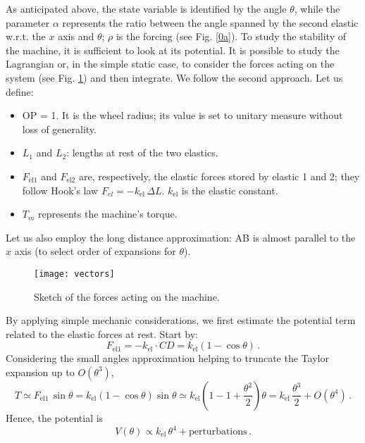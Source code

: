 As anticipated above, the state variable is identified by the angle $\theta$, while the parameter $\alpha$ represents the ratio between the angle spanned by the second elastic w.r.t. the $x$ axis and $\theta$; $\rho$ is the forcing (see Fig. \ref{0a}). To study the stability of the machine, it is sufficient to look at its potential. It is possible to study the Lagrangian \citep{nagy2013zeeman} or, in the simple static case, to consider the forces acting on the system (see Fig. \ref{vector}) and then integrate. We follow the second approach. Let us define:
\begin{itemize}
	\item OP = 1. It is the wheel radius; its value is set to unitary measure without loss of generality.
	\item $L_1$ and $L_2$: lengths at rest of the two elastics.
	\item  $F_{\text{el1}}$ and $F_{\text{el2}}$ are, respectively, the elastic forces stored by elastic 1 and 2; they follow Hook's law $F_{el} = -k_{\text{el}} \, \Delta L$. $k_{\text{el}}$ is the elastic constant.
	\item $T_m$ represents the machine's torque.
\end{itemize}
Let us also employ the long distance approximation: AB is almost parallel to the $x$ axis (to select order of expansions for $\theta$).

\begin{figure}[h!]
	\centering
	\texttt{[image: vectors]}
	\caption{\small Sketch of the forces acting on the machine.}
	\label{vector}
\end{figure}

By applying simple mechanic considerations, we first estimate the potential term related to the elastic forces at rest. Start by:
\begin{equation*}
	F_{\text{el1}} = -k_{\text{el}}  \cdot CD = k_{\text{el}} (1-\cos\theta) \, .
\end{equation*}
Considering the small angles approximation helping to truncate the Taylor expansion up to $O(\theta^3)$,
\begin{equation*}
	T \simeq F_{\text{el1}} \, \sin\theta = k_{\text{el}} (1-\cos\theta)\sin\theta \simeq k_{\text{el}} \left(1-1+\frac{\theta^2}{2} \right)\theta = k_{\text{el}} \, \frac{\theta^3}{2} + O(\theta^4) \, .
\end{equation*}
Hence, the potential is 
\begin{equation*}
	V(\theta) \propto k_{\text{el}} \, \theta^4 + \text{perturbations} \, .
\end{equation*}

